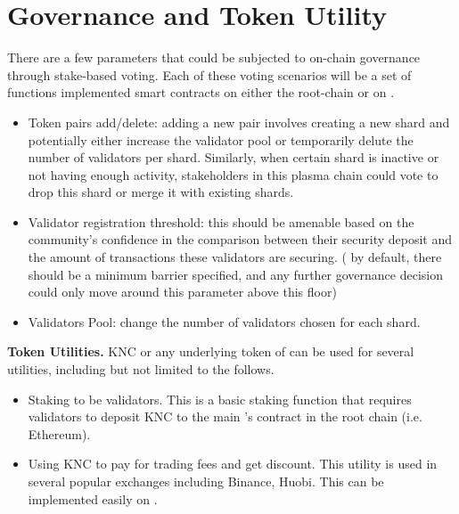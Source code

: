 \section{Governance and Token Utility}
There are a few parameters that could be subjected to on-chain governance through stake-based voting. Each of these voting scenarios will be a set of functions implemented smart contracts on either the root-chain or on \codename.

\begin{itemize}
\item Token pairs add/delete: adding a new pair involves creating a new shard and potentially either increase the validator pool or temporarily delute the number of validators per shard. Similarly, when certain shard is inactive or not having enough activity, stakeholders in this plasma chain could vote to drop this shard or merge it with existing shards.

\item Validator registration threshold: this should be amenable based on the community's confidence in the comparison between their security deposit and the amount of transactions these validators are securing. ( by default, there should be a minimum barrier specified, and any further governance decision could only move around this parameter above this floor) 
\item Validators Pool: change the number of validators chosen for each shard.

\end{itemize}
\textbf{Token Utilities.} KNC or any underlying token of \codename can be used for several utilities, including but not limited to the follows.
\begin{itemize}
\item Staking to be \codename validators. This is a basic staking function that requires validators to deposit KNC to the main \codename's contract in the root chain (i.e. Ethereum).
\item Using KNC to pay for trading fees and get discount. This utility is used in several popular exchanges including Binance, Huobi. This can be implemented easily on \codename.
\end{itemize}
